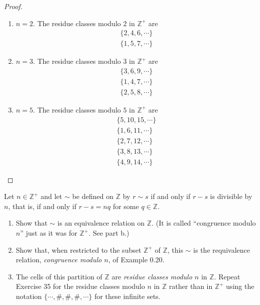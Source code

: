 \begin{proof}
    \begin{enumerate}[label={\textbf{\alph*.}},itemsep=0pt]
        \item $n = 2$. The residue classes modulo $2$ in $\mathbb{Z}^{+}$ are
              \[
                  \begin{split}
                      \{ 2, 4, 6, \cdots \} \\
                      \{ 1, 5, 7, \cdots \}
                  \end{split}
              \]
        \item $n = 3$. The residue classes modulo $3$ in $\mathbb{Z}^{+}$ are
              \[
                  \begin{split}
                      \{ 3, 6, 9, \cdots \} \\
                      \{ 1, 4, 7, \cdots \} \\
                      \{ 2, 5, 8, \cdots \}
                  \end{split}
              \]
        \item $n = 5$. The residue classes modulo $5$ in $\mathbb{Z}^{+}$ are
              \[
                  \begin{split}
                      \{ 5, 10, 15, \cdots \} \\
                      \{ 1, 6, 11, \cdots \} \\
                      \{ 2, 7, 12, \cdots \} \\
                      \{ 3, 8, 13, \cdots \} \\
                      \{ 4, 9, 14, \cdots \}
                  \end{split}
              \]
    \end{enumerate}
\end{proof}

\begin{exercise}
    Let $n\in\mathbb{Z}^{+}$ and let $\sim$ be defined on $\mathbb{Z}$ by $r\sim s$ if and only if $r - s$ is divisible by $n$, that is, if and only if $r - s = nq$ for some $q\in\mathbb{Z}$.
    \begin{enumerate}[label={\textbf{\alph*.}},itemsep=0pt]
        \item Show that $\sim$ is an equivalence relation on $\mathbb{Z}$. (It is called ``congruence modulo $n$'' just as it was for $\mathbb{Z}^{+}$. See part b.)
        \item Show that, when restricted to the subset $\mathbb{Z}^{+}$ of $\mathbb{Z}$, this $\sim$ is the requivalence relation, \textit{congruence modulo $n$}, of Example 0.20.
        \item The cells of this partition of $\mathbb{Z}$ are \textit{residue classes modulo $n$} in $\mathbb{Z}$. Repeat Exercise 35 for the residue classes modulo $n$ in $\mathbb{Z}$ rather than in $\mathbb{Z}^{+}$ using the notation $\{ \cdots, \#, \#, \#, \cdots \}$ for these infinite sets.
    \end{enumerate}
\end{exercise}


